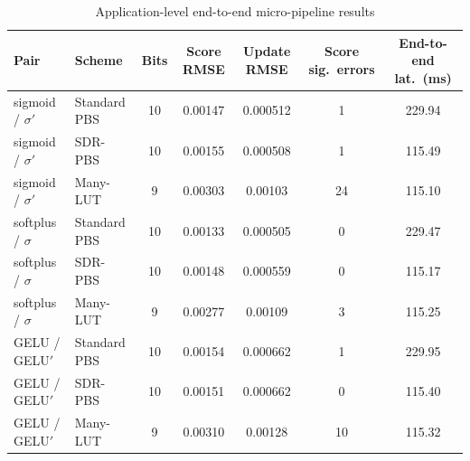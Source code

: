 \begin{table}[!t]
\caption{Application-level end-to-end micro-pipeline results}
\label{tab:end_to_end_micro_pipeline}
\centering
\footnotesize
\setlength{\tabcolsep}{3.2pt}
\renewcommand{\arraystretch}{1.10}
\begin{tabular}{@{}l l c c c c c@{}}
\toprule
Pair & Scheme & Bits & Score RMSE & Update RMSE & Score sig.\ errors & End-to-end lat.\ (ms) \\
\midrule
sigmoid / $\sigma'$ & Standard PBS & 10 & 0.00147 & 0.000512 & 1 & 229.94 \\
sigmoid / $\sigma'$ & SDR-PBS & 10 & 0.00155 & 0.000508 & 1 & 115.49 \\
sigmoid / $\sigma'$ & Many-LUT & 9 & 0.00303 & 0.00103 & 24 & 115.10 \\
softplus / $\sigma$ & Standard PBS & 10 & 0.00133 & 0.000505 & 0 & 229.47 \\
softplus / $\sigma$ & SDR-PBS & 10 & 0.00148 & 0.000559 & 0 & 115.17 \\
softplus / $\sigma$ & Many-LUT & 9 & 0.00277 & 0.00109 & 3 & 115.25 \\
GELU / GELU$'$ & Standard PBS & 10 & 0.00154 & 0.000662 & 1 & 229.95 \\
GELU / GELU$'$ & SDR-PBS & 10 & 0.00151 & 0.000662 & 0 & 115.40 \\
GELU / GELU$'$ & Many-LUT & 9 & 0.00310 & 0.00128 & 10 & 115.32 \\
\bottomrule
\end{tabular}
\end{table}
